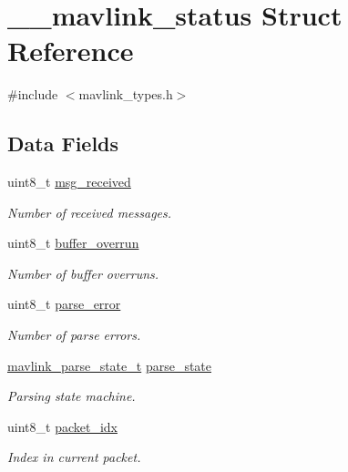 \hypertarget{struct____mavlink__status}{\section{\+\_\+\+\_\+mavlink\+\_\+status Struct Reference}
\label{struct____mavlink__status}
}


{\ttfamily \#include $<$mavlink\+\_\+types.\+h$>$}

\subsection*{Data Fields}
\begin{DoxyCompactItemize}
\item 
uint8\+\_\+t \hyperlink{struct____mavlink__status_a183576e45facc9da8123b7866d458680}{msg\+\_\+received}
\begin{DoxyCompactList}\small\item\em Number of received messages. \end{DoxyCompactList}\item 
uint8\+\_\+t \hyperlink{struct____mavlink__status_ae0ceb5a136021ee78c953f2e86d772cb}{buffer\+\_\+overrun}
\begin{DoxyCompactList}\small\item\em Number of buffer overruns. \end{DoxyCompactList}\item 
uint8\+\_\+t \hyperlink{struct____mavlink__status_ae7a52aa0c84929dbf181220c689f9ec8}{parse\+\_\+error}
\begin{DoxyCompactList}\small\item\em Number of parse errors. \end{DoxyCompactList}\item 
\hyperlink{mavlink__types_8h_a4eeb14ddb07e997fe1d671d6823e35a1}{mavlink\+\_\+parse\+\_\+state\+\_\+t} \hyperlink{struct____mavlink__status_aaf6742a61bbc641a4600184b3260fa0f}{parse\+\_\+state}
\begin{DoxyCompactList}\small\item\em Parsing state machine. \end{DoxyCompactList}\item 
uint8\+\_\+t \hyperlink{struct____mavlink__status_a3e582235849323267974003eb1793e25}{packet\+\_\+idx}
\begin{DoxyCompactList}\small\item\em Index in current packet. \end{DoxyCompactList}\item 

\end{DoxyCompactItemize}
